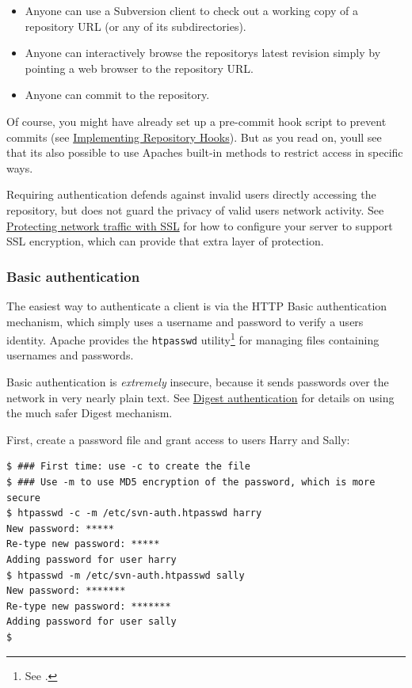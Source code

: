 \begin{itemize}
\item
  Anyone can use a Subversion client to check out a working copy of a
  repository URL (or any of its subdirectories).
\item
  Anyone can interactively browse the repository\textquotesingle s
  latest revision simply by pointing a web browser to the repository
  URL.
\item
  Anyone can commit to the repository.
\end{itemize}

Of course, you might have already set up a pre-commit hook script to
prevent commits (see \hyperref[svn.reposadmin.hooks]{Implementing
Repository Hooks}). But as you read on, you\textquotesingle ll see that
it\textquotesingle s also possible to use Apache\textquotesingle s
built-in methods to restrict access in specific ways.

Requiring authentication defends against invalid users directly
accessing the repository, but does not guard the privacy of valid
users\textquotesingle{} network activity. See
\hyperref[svn.serverconfig.httpd.ssl]{Protecting network traffic with
SSL} for how to configure your server to support SSL encryption, which
can provide that extra layer of protection.

\subsubsection{Basic
authentication}\label{svn.serverconfig.httpd.authn.basic}

The easiest way to authenticate a client is via the HTTP Basic
authentication mechanism, which simply uses a username and password to
verify a user\textquotesingle s identity. Apache provides the
\texttt{htpasswd} utility\footnote{See
  \href{https://httpd.apache.org/docs/current/programs/htpasswd.html}{}.}
for managing files containing usernames and passwords.

Basic authentication is \emph{extremely} insecure, because it sends
passwords over the network in very nearly plain text. See
\hyperref[svn.serverconfig.httpd.authn.digest]{Digest authentication}
for details on using the much safer Digest mechanism.

First, create a password file and grant access to users Harry and Sally:

\begin{verbatim}
$ ### First time: use -c to create the file
$ ### Use -m to use MD5 encryption of the password, which is more secure
$ htpasswd -c -m /etc/svn-auth.htpasswd harry
New password: *****
Re-type new password: *****
Adding password for user harry
$ htpasswd -m /etc/svn-auth.htpasswd sally
New password: *******
Re-type new password: *******
Adding password for user sally
$
\end{verbatim}

